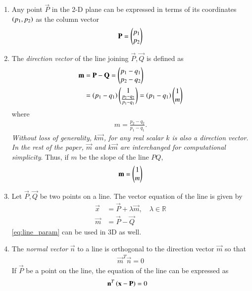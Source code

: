 \renewcommand{\theequation}{\theenumi}
\begin{enumerate}[label=\thesection.\arabic*.,ref=\thesection.\theenumi]
\item Any point $\vec{P}$ in the 2-D plane can be expressed in terms of its coordinates $\left(p_1,p_2\right)$ as the column vector
\begin{align}
\mathbf{P} = \begin{pmatrix}p_1\\p_2\end{pmatrix}
\end{align}
\item The {\em direction vector} of the line joining $\vec{P}, \vec{Q}$ is defined as 
\begin{align}
\label{eq:dir_vec}
\mathbf{m} &= \mathbf{P}-\mathbf{Q} = \begin{pmatrix}p_1-q_1\\p_2-q_2\end{pmatrix}
\\
&= \left(p_1-q_1\right)\begin{pmatrix}1 \\\frac{p_2-q_2}{p_1-q_1}\end{pmatrix} = 
\left(p_1-q_1\right)\begin{pmatrix}1 \\m\end{pmatrix}  
\end{align}
%
where 
\begin{align}
m = \frac{p_2-q_2}{p_1-q_1}.
\end{align}
{\em Without loss of generality, $k\vec{m}$, for any real scalar $k$ is also a direction vector.  In the rest of the paper, $\vec{m}$ and $k\vec{m}$ are interchanged for computational simplicity}.  Thus, if $m$ be the slope of the line $PQ$,
\begin{align}
\label{eq:dir_vec_slope}
\mathbf{m} = \begin{pmatrix}1 \\ m\end{pmatrix}
\end{align}
%
\item Let $\vec{P},\vec{Q}$ be two points on a line.  The vector equation of the line is given by
\begin{align}
\label{eq:line_param}
\vec{x} &= \vec{P} + \lambda \vec{m}, \quad \lambda \in \mathbb{R}
\\
\vec{m} &= \vec{P}-\vec{Q}
\end{align}
\eqref{eq:line_param} can be used in 3D as well.
%
\item The {\em normal vector} $\vec{n}$ to a line is orthogonal to the direction vector $\vec{m}$ so that
\begin{align}
\label{eq:line_dir_norm}
\vec{m}^T\vec{n} = 0
\end{align}
%
If $\vec{P}$ be a point on the line, the equation of the line can be expressed as
\begin{align}
\label{eq:line_norm_eq}
\vec{n}^T\brak{\vec{x}-\vec{P}} &= 0

\end{align}
\end{enumerate}
